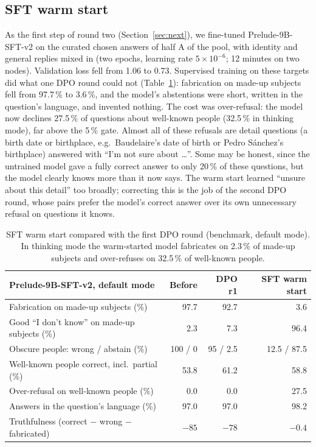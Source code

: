 \documentclass[11pt,a4paper]{article}
\begin{document}
\subsection{SFT warm start}
\label{sec:warmstart}

As the first step of round two (Section~\ref{sec:next}), we fine-tuned Prelude-9B-SFT-v2 on the curated chosen answers of half A of the pool, with identity and general replies mixed in (two epochs, learning rate $5\times10^{-6}$; 12 minutes on two nodes).
Validation loss fell from 1.06 to 0.73.
Supervised training on these targets did what one DPO round could not (Table~\ref{tab:warm}): fabrication on made-up subjects fell from 97.7\,\% to 3.6\,\%, and the model's abstentions were short, written in the question's language, and invented nothing.
The cost was over-refusal: the model now declines 27.5\,\% of questions about well-known people (32.5\,\% in thinking mode), far above the 5\,\% gate.
Almost all of these refusals are detail questions (a birth date or birthplace, e.g.\ Baudelaire's date of birth or Pedro Sánchez's birthplace) answered with ``I'm not sure about \ldots''.
Some may be honest, since the untrained model gave a fully correct answer to only 20\,\% of these questions, but the model clearly knows more than it now says.
The warm start learned ``unsure about this detail'' too broadly; correcting this is the job of the second DPO round, whose pairs prefer the model's correct answer over its own unnecessary refusal on questions it knows.

\begin{table}[t]
\centering
\small
\begin{tabular}{@{}lrrr@{}}
\toprule
Prelude-9B-SFT-v2, default mode & Before & DPO r1 & SFT warm start \\
\midrule
Fabrication on made-up subjects (\%) & 97.7 & 92.7 & 3.6 \\
Good ``I don't know'' on made-up subjects (\%) & 2.3 & 7.3 & 96.4 \\
Obscure people: wrong / abstain (\%) & 100 / 0 & 95 / 2.5 & 12.5 / 87.5 \\
Well-known people correct, incl.\ partial (\%) & 53.8 & 61.2 & 58.8 \\
Over-refusal on well-known people (\%) & 0.0 & 0.0 & 27.5 \\
Answers in the question's language (\%) & 97.0 & 97.0 & 98.2 \\
Truthfulness (correct $-$ wrong $-$ fabricated) & $-85$ & $-78$ & $-0.4$ \\
\bottomrule
\end{tabular}
\caption{SFT warm start compared with the first DPO round (benchmark, default mode). In thinking mode the warm-started model fabricates on 2.3\,\% of made-up subjects and over-refuses on 32.5\,\% of well-known people.}
\label{tab:warm}
\end{table}
\end{document}
